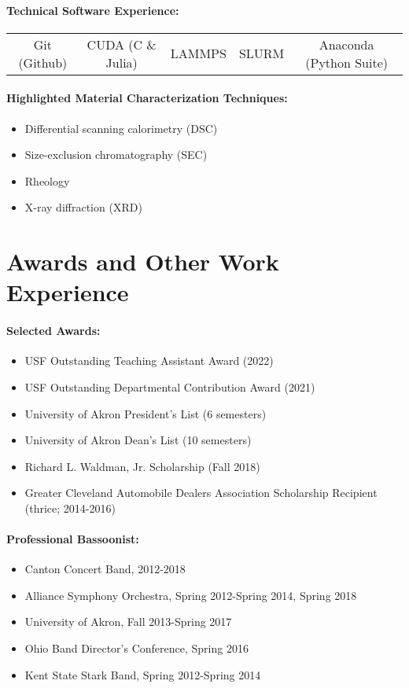 \documentclass{my_cv}
\begin{document}
\paragraph{Technical Software Experience:}
\begin{center}
\begin{tabular}{c|c|c|c|c}
   Git (Github) & CUDA (C \& Julia) & LAMMPS & SLURM & Anaconda (Python Suite) \\
\end{tabular}
\end{center}

\paragraph{Highlighted Material Characterization Techniques:}

\begin{itemize}
    \item Differential scanning calorimetry (DSC)
    \item Size-exclusion chromatography (SEC)
    \item Rheology
    \item X-ray diffraction (XRD)
\end{itemize}

\section{Awards and Other Work Experience}

\paragraph{Selected Awards:}
\begin{itemize}
    \item USF Outstanding Teaching Assistant Award (2022)
    \item USF Outstanding Departmental Contribution Award (2021)
    \item University of Akron President's List (6 semesters)
    \item University of Akron Dean's List (10 semesters)
    \item Richard L. Waldman, Jr. Scholarship (Fall 2018)
    \item Greater Cleveland Automobile Dealers Association Scholarship Recipient (thrice; 2014-2016)
\end{itemize}

\paragraph{Professional Bassoonist:}
\begin{itemize}
	\item Canton Concert Band, 2012-2018
	\item Alliance Symphony Orchestra, Spring 2012-Spring 2014, Spring 2018
    \item University of Akron, Fall 2013-Spring 2017
	\item Ohio Band Director’s Conference, Spring 2016
	\item Kent State Stark Band, Spring 2012-Spring 2014
\end{itemize}
\end{document}
